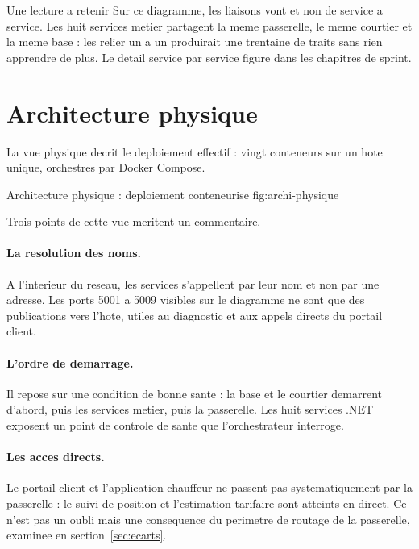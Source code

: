 \begin{definitionbox}{Une lecture a retenir}
Sur ce diagramme, les liaisons vont  et non
de service a service. Les huit services metier partagent la meme
passerelle, le meme courtier et la meme base : les relier un a un
produirait une trentaine de traits sans rien apprendre de plus. Le detail
service par service figure dans les chapitres de sprint.
\end{definitionbox}

\section{Architecture physique}
\label{sec:archi-physique}

La vue physique decrit le deploiement effectif : vingt conteneurs sur un
hote unique, orchestres par Docker Compose.

  {Architecture physique : deploiement conteneurise}
  {fig:archi-physique}

Trois points de cette vue meritent un commentaire.

\paragraph{La resolution des noms.}
A l'interieur du reseau, les services s'appellent par leur nom et non par
une adresse. Les ports 5001 a 5009 visibles sur le diagramme ne sont que
des publications vers l'hote, utiles au diagnostic et aux appels directs
du portail client.

\paragraph{L'ordre de demarrage.}
Il repose sur une condition de bonne sante : la base et le courtier
demarrent d'abord, puis les services metier, puis la passerelle. Les huit
services .NET exposent un point de controle de sante que
l'orchestrateur interroge.

\paragraph{Les acces directs.}
Le portail client et l'application chauffeur ne passent pas systematiquement
par la passerelle : le suivi de position et l'estimation tarifaire sont
atteints en direct. Ce n'est pas un oubli mais une consequence du
perimetre de routage de la passerelle, examinee en
section~\ref{sec:ecarts}.

